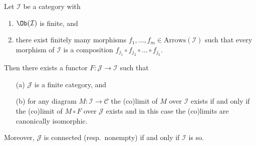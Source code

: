 \begin{lemma}
\label{lemma-finite-diagram-category}
Let $\mathcal{I}$ be a category with
\begin{enumerate}
\item $\Ob(\mathcal{I})$ is finite, and
\item there exist finitely many morphisms
$f_1, \ldots, f_m \in \text{Arrows}(\mathcal{I})$ such
that every morphism of $\mathcal{I}$ is a composition
$f_{j_1} \circ f_{j_2} \circ \ldots \circ f_{j_k}$.
\end{enumerate}
Then there exists a functor $F : \mathcal{J} \to \mathcal{I}$
such that
\begin{enumerate}
\item[(a)] $\mathcal{J}$ is a finite category, and
\item[(b)] for any diagram $M : \mathcal{I} \to \mathcal{C}$ the
(co)limit of $M$ over $\mathcal{I}$ exists if and only if
the (co)limit of $M \circ F$ over $\mathcal{J}$ exists and in this case
the (co)limits are canonically isomorphic.
\end{enumerate}
Moreover, $\mathcal{J}$ is connected (resp.\ nonempty) if and only if
$\mathcal{I}$ is so.
\end{lemma}

